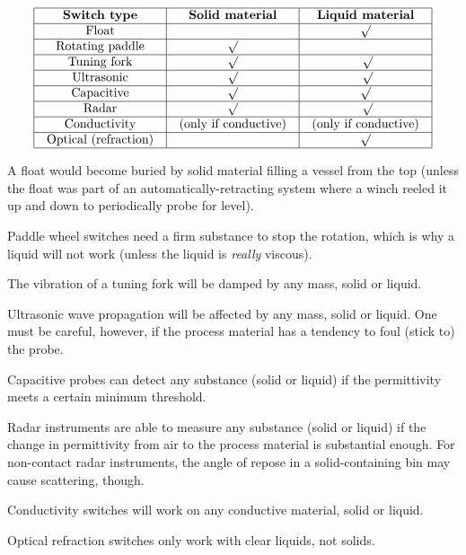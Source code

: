 






$$\vbox{\offinterlineskip
\halign{\strut
\vrule \quad\hfil # \ \hfil & 
\vrule \quad\hfil # \ \hfil & 
\vrule \quad\hfil # \ \hfil \vrule \cr
\noalign{\hrule}
%
{\bf Switch type} & {\bf Solid material} & {\bf Liquid material} \cr
%
\noalign{\hrule}
%
Float &  & $\surd$ \cr
%
\noalign{\hrule}
%
Rotating paddle & $\surd$ & \cr
%
\noalign{\hrule}
%
Tuning fork & $\surd$ & $\surd$\cr
%
\noalign{\hrule}
%
Ultrasonic & $\surd$ & $\surd$\cr
%
\noalign{\hrule}
%
Capacitive & $\surd$ & $\surd$ \cr
%
\noalign{\hrule}
%
Radar & $\surd$ & $\surd$\cr
%
\noalign{\hrule}
%
Conductivity & (only if conductive) & (only if conductive) \cr
%
\noalign{\hrule}
%
Optical (refraction) &  & $\surd$ \cr
%
\noalign{\hrule}
} %
}$$ %

A float would become buried by solid material filling a vessel from the top (unless the float was part of an automatically-retracting system where a winch reeled it up and down to periodically probe for level).

\vskip 10pt

Paddle wheel switches need a firm substance to stop the rotation, which is why a liquid will not work (unless the liquid is {\it really} viscous).

\vskip 10pt

The vibration of a tuning fork will be damped by any mass, solid or liquid.

\vskip 10pt

Ultrasonic wave propagation will be affected by any mass, solid or liquid.  One must be careful, however, if the process material has a tendency to foul (stick to) the probe.

\vskip 10pt

Capacitive probes can detect any substance (solid or liquid) if the permittivity meets a certain minimum threshold.

\vskip 10pt

Radar instruments are able to measure any substance (solid or liquid) if the change in permittivity from air to the process material is substantial enough.  For non-contact radar instruments, the angle of repose in a solid-containing bin may cause scattering, though.

\vskip 10pt

Conductivity switches will work on any conductive material, solid or liquid.

\vskip 10pt

Optical refraction switches only work with clear liquids, not solids.









